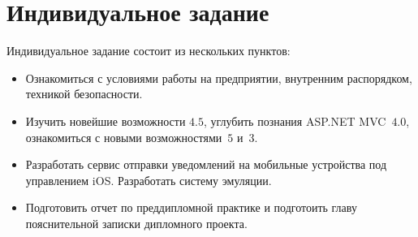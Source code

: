 \section{Индивидуальное задание}
\label{sec:practice:individual_task}
Индивидуальное задание состоит из нескольких пунктов:
\begin{itemize}
  \item Ознакомиться с условиями работы на предприятии, внутренним распорядком, техникой безопасности.
  \item Изучить новейшие возможности \netfx{} $4.5$, углубить познания ASP.NET MVC~$4.0$, ознакомиться с новыми возможностями \csharp{}\,$5$ и \fsharp{}\,$3$.
  \item Разработать сервис отправки уведомлений на мобильные устройства под управлением iOS. Разработать систему эмуляции. 
  \item Подготовить отчет по преддипломной практике и подготоить главу пояснительной записки дипломного проекта.
\end{itemize}